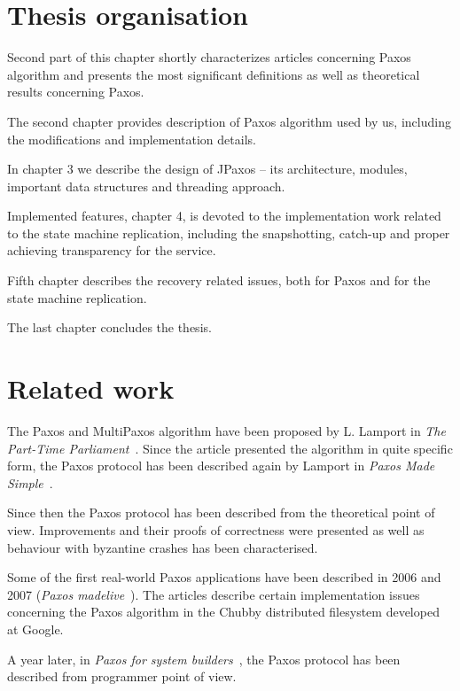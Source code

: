 \section{Thesis organisation}
Second part of this chapter %
shortly characterizes articles concerning Paxos algorithm and presents the most significant definitions as well as theoretical results concerning Paxos.

The second chapter provides description of Paxos algorithm used by us, including the modifications and implementation details.

In chapter 3 we describe the design of JPaxos -- its architecture, modules, important data structures and threading approach.

Implemented features, chapter 4, is devoted to the implementation work related to the state machine replication, including the snapshotting, catch-up and proper achieving transparency for the service.

Fifth chapter describes the recovery related issues, both for Paxos and for the state machine replication.

The last chapter concludes the thesis. %

\section{Related work}



The Paxos and MultiPaxos algorithm have been proposed by L. Lamport in \textit{The Part-Time Parliament}~\cite{Lam98}. Since the article presented the algorithm in quite specific form, the Paxos protocol has been described again by Lamport in \textit{Paxos Made Simple}~\cite{Lam01}.

Since then the Paxos protocol has been described from the theoretical point of view. Improvements and their proofs of correctness were presented as well as behaviour with byzantine crashes has been characterised.

Some of the first real-world Paxos applications have been described in 2006 and 2007 (\textit{Paxos made\linebreak live}~\cite{CGR07}). The articles describe certain implementation issues concerning the Paxos algorithm in the Chubby distributed filesystem developed at Google.

A year later, in \textit{Paxos for system builders}~\cite{AK08}, the Paxos protocol has been described from programmer point of view.

